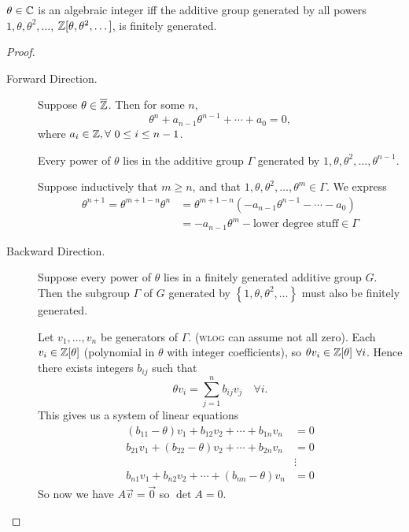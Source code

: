 \begin{lemma}
    $\theta\in\mathbb C$ is an algebraic integer iff the additive group generated by all powers $1, \theta, \theta^2, \dots$, $\mathbb Z[\theta, \theta^2, \dots]$, is finitely generated.
\end{lemma}
\begin{proof}
    \begin{description}
        \item[Forward Direction.] Suppose $\theta\in\overline{\mathbb Z}$. Then for some $n$,
            \[\theta^n  + a_{n-1}\theta^{n-1} + \cdots + a_0 = 0,\]
            where $a_i\in\mathbb Z, \forall\ 0\leq i\leq n-1$.
            \begin{claim*}
                Every power of $\theta$ lies in the additive group $\Gamma$ generated by $1, \theta, \theta^2, \dots, \theta^{n-1}$.
            \end{claim*}
            Suppose inductively that $m\geq n$, and that $1, \theta, \theta^2, \dots, \theta^m\in\Gamma$. We express
            \begin{align*}
                \theta^{n+1} = \theta^{m+1-n}\theta^n & = \theta^{m+1-n}(-a_{n-1}\theta^{n-1} - \cdots - a_0)     \\
                                                      & = -a_{n-1}\theta^m - \text{lower degree stuff} \in \Gamma
            \end{align*}
        \item[Backward Direction.] Suppose every power of $\theta$ lies in a finitely generated additive group $G$. Then the subgroup $\Gamma$ of $G$ generated by $\left\{ 1, \theta, \theta^2, \dots \right\}$ must also be finitely generated.

            Let $v_1, \dots, v_n$ be generators of $\Gamma$. (\textsc{wlog} can assume not all zero). Each $v_i \in\mathbb Z[\theta]$ (polynomial in $\theta$ with integer coefficients), so $\theta v_i\in\mathbb Z[\theta]\ \forall i$. Hence there exists integers $b_{ij}$ such that
            \[\theta v_i = \sum_{j=1}^n b_{ij}v_j\quad \forall i.\]
            This gives us a system of linear equations
            \begin{align*}
                (b_{11}-\theta)v_1 + b_{12}v_2 + \cdots + b_{1n}v_n & = 0    \\
                b_{21}v_1 + (b_{22}-\theta)v_2 + \cdots + b_{2n}v_n & = 0    \\
                                                                    & \vdots \\
                b_{n1}v_1 + b_{n2}v_2 + \cdots + (b_{nn}-\theta)v_n & = 0
            \end{align*}
            So now we have $A\vec{v} = \vec{0}$ so $\det{A} = 0$.


\end{description}
\end{proof}
